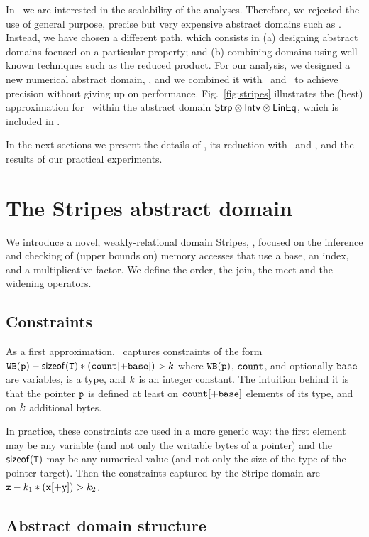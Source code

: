 \documentclass[10pt]{sigplanconf}
\begin{document}
In \Clousot\ we are interested in the scalability of the analyses.
Therefore, we rejected the use of general purpose, precise but very
expensive abstract domains such as \Polyhedra.  Instead, we have
chosen a different path, which consists in (a) designing abstract
domains focused on a particular property; and (b) combining domains using
well-known techniques such as the reduced product.  For our analysis,
we designed a new numerical abstract domain, \Stripes, and we combined
it with \Intervals\ and \Karr\ to achieve precision without giving up
on performance.  Fig.~\ref{fig:stripes} illustrates the (best)
approximation for \points\ within the abstract domain $\mathsf{Strp}
\otimes \mathsf{Intv} \otimes \mathsf{LinEq}$, which is included in \plane.

In the next sections we present the details of \Stripes, its reduction
with \Intervals\ and \Karr, and the results of our practical
experiments.



\section{The Stripes abstract domain}
We introduce a novel, weakly-relational domain Stripes, \Stripes,
focused on the inference and checking of (upper bounds on) memory
accesses that use a base, an index, and a multiplicative factor. 
We define the order, the join, the meet and the widening operators.

\subsection{Constraints}
As a first approximation, \Stripes\ captures constraints of the form 
$\mathtt{WB}(\mathtt{\mathtt{p}})-\mathsf{sizeof}(\mathtt{T})*(\mathtt{count}[+\mathtt{base}])>k$ 
where $\mathtt{WB}(\mathtt{\mathtt{p}})$, $\mathtt{count}$, and optionally $\mathtt{base}$ are variables,  is a type, and $k$ is an integer constant.
The intuition behind it is that the pointer $\mathtt{p}$ is defined at least on $\mathtt{count}[+\mathtt{base}]$ elements of its type, and on $k$ additional bytes.

In  practice, these constraints are used in a more generic way: the
first element may be any variable (and not only the writable bytes of
a pointer) and the $\mathsf{sizeof}(\mathtt{T})$ may be any numerical value (and not
only the size of the type of the pointer target). 
Then the constraints captured by the Stripe domain are
$\mathtt{z}-k_1*(\mathtt{x}[+\mathtt{y}])>k_2$.

\subsection{Abstract domain structure}
\end{document}
